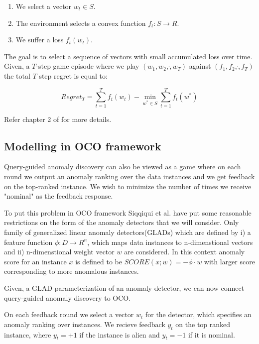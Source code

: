 \begin{enumerate}
    \setlength\itemsep{-0.5em}
    \item We select a vector $w_t \in S$.
    \item The environment selects a convex function $f_t:S \rightarrow R$.
    \item We suffer a loss $f_t(w_t)$.
\end{enumerate}

The goal is to select a sequence of vectors with small accumulated loss over time. 
Given, a $T$-step game episode where we play $(w_1, w_2, \dot , w_T)$ against $(f_1, f_2, \dot,f_T)$ the total $T$ step regret is equal to:

\begin{equation}
    \label{eq:regret}
    Regret_T = \sum_{t=1}^{T} f_t(w_t) - \min_{w^* \in S} \sum_{t=1}^{T} f_t(w^*)
\end{equation}

Refer chapter 2 of \cite{10.1561/2200000018} for more details.

\subsection{Modelling in OCO framework}
\label{subsec:query-guided-anomaly-discovery-as-oco}

Query-guided anomaly discovery can also be viewed as a game
where on each round we output an anomaly ranking over the data
instances and we get feedback on the top-ranked instance. We
wish to minimize the number of times we receive "nominal" as the
feedback response.

To put this problem in OCO framework Siqqiqui et al. \cite{10.1145/3219819.3220083} have put some reasonable restrictions on the form of the anomaly detectors that we will consider.
Only family of generalized linear anomaly detectors(GLADs) which are defined by i) a feature function $\phi : D \rightarrow R^n$, which maps data instances to n-dimenstional vectors and ii) n-dimenstional weight vector $w$ are considered.
In this context anomaly score for an instance $x$ is defined to be $SCORE(x;w) = - \phi \cdot w$ with larger score corresponding to more anomalous instances.



Given, a GLAD parameterization of an anomaly detector, we can now connect query-guided anomaly discovery to OCO.

On each feedback round we select a vector $w_t$ for the detector, which specifies an anomaly ranking over instances. 
We recieve feedback $y_t$ on the top ranked instance, where $y_t = +1$ if the instance is alien and $y_t = -1$ if it is nominal.

